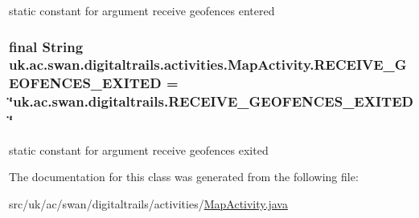 static constant for argument receive geofences entered 

\hypertarget{classuk_1_1ac_1_1swan_1_1digitaltrails_1_1activities_1_1_map_activity_a8e2d03d80668ec761b99a7e48063327d}{
\subsubsection[{R\+E\+C\+E\+I\+V\+E\+\_\+\+G\+E\+O\+F\+E\+N\+C\+E\+S\+\_\+\+E\+X\+I\+T\+E\+D}]{\setlength{\rightskip}{0pt plus 5cm}final String uk.\+ac.\+swan.\+digitaltrails.\+activities.\+Map\+Activity.\+R\+E\+C\+E\+I\+V\+E\+\_\+\+G\+E\+O\+F\+E\+N\+C\+E\+S\+\_\+\+E\+X\+I\+T\+E\+D = \char`\"{}uk.\+ac.\+swan.\+digitaltrails.\+R\+E\+C\+E\+I\+V\+E\+\_\+\+G\+E\+O\+F\+E\+N\+C\+E\+S\+\_\+\+E\+X\+I\+T\+E\+D\char`\"{}\hspace{0.3cm}{\ttfamily [static]}}}\label{classuk_1_1ac_1_1swan_1_1digitaltrails_1_1activities_1_1_map_activity_a8e2d03d80668ec761b99a7e48063327d}


static constant for argument receive geofences exited 



The documentation for this class was generated from the following file\+:\begin{DoxyCompactItemize}
\item 
src/uk/ac/swan/digitaltrails/activities/\hyperlink{_map_activity_8java}{Map\+Activity.\+java}\end{DoxyCompactItemize}
